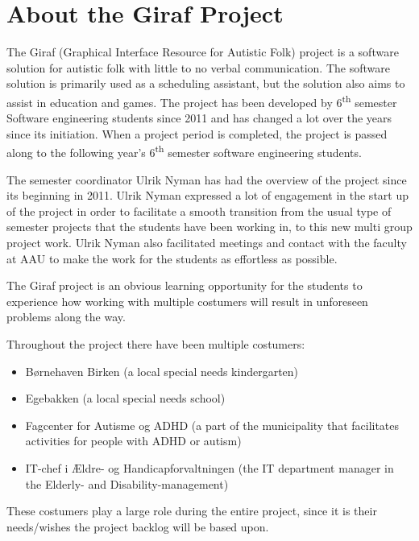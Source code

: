 \section{About the Giraf Project}
The Giraf (Graphical Interface Resource for Autistic Folk) project is a software solution for autistic folk with little to no verbal communication.
The software solution is primarily used as a scheduling assistant, but the solution also aims to assist in education and games.
The project has been developed by 6\textsuperscript{th} semester Software engineering students since 2011 and has changed a lot over the years since its initiation.
When a project period is completed, the project is passed along to the following year's 6\textsuperscript{th} semester software engineering students.

The semester coordinator Ulrik Nyman has had the overview of the project since its beginning in 2011.
Ulrik Nyman expressed a lot of engagement in the start up of the project in order to facilitate a smooth transition from the usual type of semester projects that the students have been working in, to this new multi group project work.
Ulrik Nyman also facilitated meetings and contact with the faculty at AAU to make the work for the students as effortless as possible.

The Giraf project is an obvious learning opportunity for the students to experience how working with multiple costumers will result in unforeseen problems along the way.

Throughout the project there have been multiple costumers:

\begin{itemize}
	\item Børnehaven Birken (a local special needs kindergarten)
	\item Egebakken (a local special needs school)
	\item Fagcenter for Autisme og ADHD (a part of the municipality that facilitates activities for people with ADHD or autism)
	\item IT-chef i Ældre- og Handicapforvaltningen (the IT department manager in the Elderly- and Disability-management)
\end{itemize}

These costumers play a large role during the entire project, since it is their needs/wishes the project backlog will be based upon.
